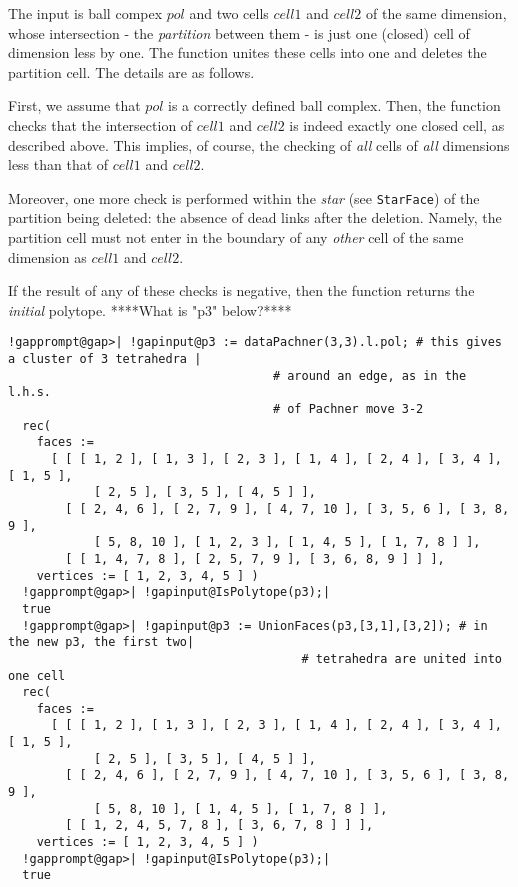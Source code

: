 \documentclass[a4paper,11pt]{report}
\begin{document}
{{{ The input is ball compex $pol$ and two cells $cell1$ and $cell2$ of the same dimension, whose intersection - the \emph{partition} between them - is just one (closed) cell of dimension less by one. The
function unites these cells into one and deletes the partition cell. The
details are as follows. 

 First, we assume that $pol$ is a correctly defined ball complex. Then, the function checks that the
intersection of $cell1$ and $cell2$ is indeed exactly one closed cell, as described above. This implies, of
course, the checking of \emph{all} cells of \emph{all} dimensions less than that of $cell1$ and $cell2$. 

 Moreover, one more check is performed within the \emph{star} (see \texttt{StarFace}) of the partition being deleted: the absence of dead links after the
deletion. Namely, the partition cell must not enter in the boundary of any \emph{other} cell of the same dimension as $cell1$ and $cell2$. 

 If the result of any of these checks is negative, then the function returns
the \emph{initial} polytope. ****What is "p3" below?**** 
\begin{Verbatim}[commandchars=!@|,fontsize=\small,frame=single,label=Example]
  !gapprompt@gap>| !gapinput@p3 := dataPachner(3,3).l.pol; # this gives a cluster of 3 tetrahedra |
                                     # around an edge, as in the l.h.s.
                                     # of Pachner move 3-2
  rec( 
    faces := 
      [ [ [ 1, 2 ], [ 1, 3 ], [ 2, 3 ], [ 1, 4 ], [ 2, 4 ], [ 3, 4 ], [ 1, 5 ], 
            [ 2, 5 ], [ 3, 5 ], [ 4, 5 ] ], 
        [ [ 2, 4, 6 ], [ 2, 7, 9 ], [ 4, 7, 10 ], [ 3, 5, 6 ], [ 3, 8, 9 ], 
            [ 5, 8, 10 ], [ 1, 2, 3 ], [ 1, 4, 5 ], [ 1, 7, 8 ] ], 
        [ [ 1, 4, 7, 8 ], [ 2, 5, 7, 9 ], [ 3, 6, 8, 9 ] ] ], 
    vertices := [ 1, 2, 3, 4, 5 ] )
  !gapprompt@gap>| !gapinput@IsPolytope(p3);|
  true
  !gapprompt@gap>| !gapinput@p3 := UnionFaces(p3,[3,1],[3,2]); # in the new p3, the first two|
                                         # tetrahedra are united into one cell
  rec( 
    faces := 
      [ [ [ 1, 2 ], [ 1, 3 ], [ 2, 3 ], [ 1, 4 ], [ 2, 4 ], [ 3, 4 ], [ 1, 5 ], 
            [ 2, 5 ], [ 3, 5 ], [ 4, 5 ] ], 
        [ [ 2, 4, 6 ], [ 2, 7, 9 ], [ 4, 7, 10 ], [ 3, 5, 6 ], [ 3, 8, 9 ], 
            [ 5, 8, 10 ], [ 1, 4, 5 ], [ 1, 7, 8 ] ], 
        [ [ 1, 2, 4, 5, 7, 8 ], [ 3, 6, 7, 8 ] ] ], 
    vertices := [ 1, 2, 3, 4, 5 ] )
  !gapprompt@gap>| !gapinput@IsPolytope(p3);|
  true
  						

\end{Verbatim}}}}
\end{document}
